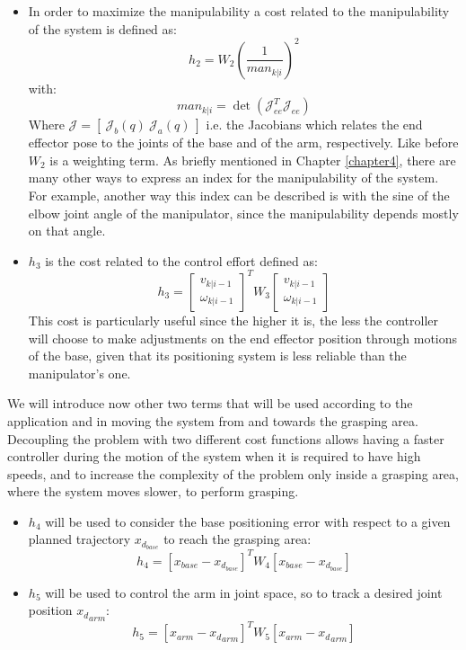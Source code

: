 \begin{itemize}
\item In order to maximize the manipulability a cost related to the manipulability of the system is defined as:
\begin{equation}
h_2 = W_2 \left( \frac{1}{man_{k|i}} \right)^2
\end{equation}
with:
\begin{equation}
man_{k|i} =  \det(\mathcal{J}_{ee}^T\mathcal{J}_{ee})
\end{equation}
Where $\mathcal{J}=[\ \mathcal{J}_b(q)\ \mathcal{J}_a(q)\ ]$ i.e. the Jacobians which relates the end effector pose to the joints of the base and of the arm, respectively. Like before $W_2$ is a weighting term. As briefly mentioned in Chapter \ref{chapter4}, there are many other ways to express an index for the manipulability of the system. For example, another way this index can be described is with the sine of the elbow joint angle of the manipulator, since the manipulability depends mostly on that angle.
    
\item $h_3$ is the cost related to the control effort defined as: 
	\begin{equation}
	        h_3=\left[ \begin{matrix} v_{k|i-1} \\ \omega_{k|i-1} \end{matrix}\right]^T W_3 \left[ \begin{matrix} v_{k|i-1} \\ \omega_{k|i-1} \end{matrix}\right]
	 \end{equation}
This cost is particularly useful since the higher it is, the less the controller will choose to make adjustments on the end effector position through motions of the base, given that its positioning system is less reliable than the manipulator's one.
\end{itemize}
We will introduce now other two terms that will be used according to the application and in moving the system from and towards the grasping area. Decoupling the problem with two different cost functions allows having a faster controller during the motion of the system when it is required to have high speeds, and to increase the complexity of the problem only inside a grasping area, where the system moves slower, to perform grasping. 
\begin{itemize}
    \item $h_4$ will be used to consider the base positioning error with respect to a given planned trajectory $x_{d_{base}}$ to reach the grasping area:
        \begin{equation}
            h_4=[x_{base}-x_{d_{base}}]^T W_4 [x_{base}-x_{d_{base}}]
        \end{equation}
     \item $h_5$ will be used to control the arm in joint space, so to track a desired joint position ${x_d}_{arm}$:
    \begin{equation}
       h_5=[x_{arm}-{x_d}_{arm}]^T W_5 [x_{arm}-{x_d}_{arm}]
    \end{equation}
\end{itemize}
